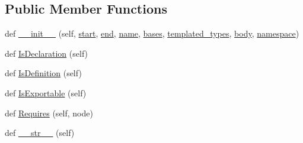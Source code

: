 \subsection*{Public Member Functions}
\begin{DoxyCompactItemize}
\item 
def \mbox{\hyperlink{classgoogletest-master_1_1googlemock_1_1scripts_1_1generator_1_1cpp_1_1ast_1_1_class_a8edc0179969d71db058163865fa2c256}{\+\_\+\+\_\+init\+\_\+\+\_\+}} (self, \mbox{\hyperlink{classgoogletest-master_1_1googlemock_1_1scripts_1_1generator_1_1cpp_1_1ast_1_1_node_a6f9eb279a989f9ca27e7d0f1975336d1}{start}}, \mbox{\hyperlink{classgoogletest-master_1_1googlemock_1_1scripts_1_1generator_1_1cpp_1_1ast_1_1_node_a747e90ade89c1764e83b5b649bde18cc}{end}}, \mbox{\hyperlink{classgoogletest-master_1_1googlemock_1_1scripts_1_1generator_1_1cpp_1_1ast_1_1___generic_declaration_a85dc1c6f0115301c310cd3f99416fa86}{name}}, \mbox{\hyperlink{classgoogletest-master_1_1googlemock_1_1scripts_1_1generator_1_1cpp_1_1ast_1_1_class_a80ca8b5a6f9978550f137cb10abb1de3}{bases}}, \mbox{\hyperlink{classgoogletest-master_1_1googlemock_1_1scripts_1_1generator_1_1cpp_1_1ast_1_1_class_a1cabff5f0ced4a0d63c214a691f50d96}{templated\+\_\+types}}, \mbox{\hyperlink{classgoogletest-master_1_1googlemock_1_1scripts_1_1generator_1_1cpp_1_1ast_1_1_class_a868debe7fdd945622b31e888f9f37707}{body}}, \mbox{\hyperlink{classgoogletest-master_1_1googlemock_1_1scripts_1_1generator_1_1cpp_1_1ast_1_1___generic_declaration_a285067decd742f4effc0d1bc674bce85}{namespace}})
\item 
def \mbox{\hyperlink{classgoogletest-master_1_1googlemock_1_1scripts_1_1generator_1_1cpp_1_1ast_1_1_class_a756fb1d87be3d6009451550c7fd6442a}{Is\+Declaration}} (self)
\item 
def \mbox{\hyperlink{classgoogletest-master_1_1googlemock_1_1scripts_1_1generator_1_1cpp_1_1ast_1_1_class_a79ec9f801f17c9f4d7868e0b1d10d10d}{Is\+Definition}} (self)
\item 
def \mbox{\hyperlink{classgoogletest-master_1_1googlemock_1_1scripts_1_1generator_1_1cpp_1_1ast_1_1_class_a3b7f1d83393fd1bdd228a4e3be88f21f}{Is\+Exportable}} (self)
\item 
def \mbox{\hyperlink{classgoogletest-master_1_1googlemock_1_1scripts_1_1generator_1_1cpp_1_1ast_1_1_class_a572f01c46482ba4dd42fec43cce8ec1a}{Requires}} (self, node)
\item 
def \mbox{\hyperlink{classgoogletest-master_1_1googlemock_1_1scripts_1_1generator_1_1cpp_1_1ast_1_1_class_ac7048b2849d2c0a806dfa1aed6ea5b49}{\+\_\+\+\_\+str\+\_\+\+\_\+}} (self)
\end{DoxyCompactItemize}
